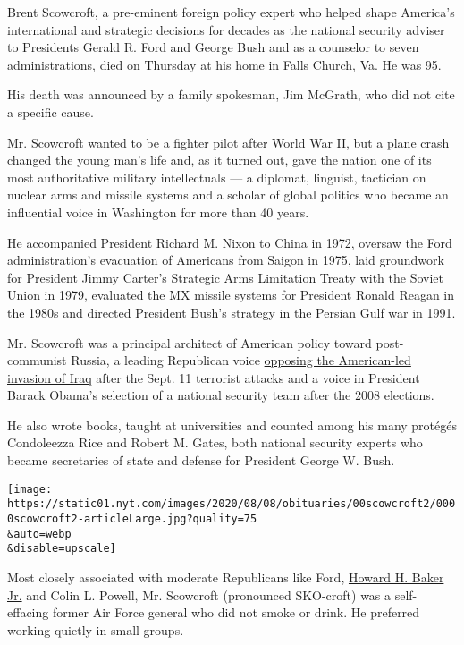 Brent Scowcroft, a pre-eminent foreign policy expert who helped shape
America's international and strategic decisions for decades as the
national security adviser to Presidents Gerald R. Ford and George Bush
and as a counselor to seven administrations, died on Thursday at his
home in Falls Church, Va. He was 95.

His death was announced by a family spokesman, Jim McGrath, who did not
cite a specific cause.

Mr. Scowcroft wanted to be a fighter pilot after World War II, but a
plane crash changed the young man's life and, as it turned out, gave the
nation one of its most authoritative military intellectuals --- a
diplomat, linguist, tactician on nuclear arms and missile systems and a
scholar of global politics who became an influential voice in Washington
for more than 40 years.

He accompanied President Richard M. Nixon to China in 1972, oversaw the
Ford administration's evacuation of Americans from Saigon in 1975, laid
groundwork for President Jimmy Carter's Strategic Arms Limitation Treaty
with the Soviet Union in 1979, evaluated the MX missile systems for
President Ronald Reagan in the 1980s and directed President Bush's
strategy in the Persian Gulf war in 1991.

Mr. Scowcroft was a principal architect of American policy toward
post-communist Russia, a leading Republican voice
\href{https://www.wsj.com/articles/SB1029371773228069195}{opposing the
American-led invasion of Iraq} after the Sept. 11 terrorist attacks and
a voice in President Barack Obama's selection of a national security
team after the 2008 elections.

He also wrote books, taught at universities and counted among his many
protégés Condoleezza Rice and Robert M. Gates, both national security
experts who became secretaries of state and defense for President George
W. Bush.

\texttt{[image: https://static01.nyt.com/images/2020/08/08/obituaries/00scowcroft2/0000scowcroft2-articleLarge.jpg?quality=75\\\&auto=webp\\\&disable=upscale]}

Most closely associated with moderate Republicans like Ford,
\href{https://www.nytimes.com/2014/06/27/us/politics/howard-h-baker-jr-great-conciliator-of-senate-dies-at-88.html}{Howard
H. Baker Jr.} and Colin L. Powell, Mr. Scowcroft (pronounced SKO-croft)
was a self-effacing former Air Force general who did not smoke or drink.
He preferred working quietly in small groups.

